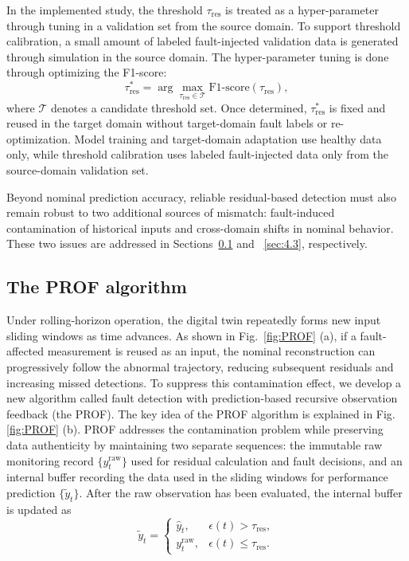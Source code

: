\documentclass[a4paper,10pt]{cas-sc}%
\newcommand{\rev}[1]{#1}
\newcommand{\roundtworev}[1]{\textcolor{roundtwored}{#1}}
\newenvironment{revision}{}{}
\begin{document}
\rev{In the implemented study, the threshold $\tau_{\mathrm{res}}$ is treated as a hyper-parameter through tuning in a validation set from the source domain. To support threshold calibration, a small amount of labeled fault-injected validation data is generated through simulation in the source domain. The hyper-parameter tuning is done through optimizing the F1-score:}
\begin{equation}
	{
		\tau_{\mathrm{res}}^{\ast}
		=\arg\max_{\tau_{\mathrm{res}}\in\mathcal{T}}
		\mathrm{F1\text{-}score}(\tau_{\mathrm{res}}),}
	\label{eq:threshold_optimization}
\end{equation}
\begin{revision}
	where $\mathcal{T}$ denotes a candidate threshold set. Once determined, $\tau_{\mathrm{res}}^{\ast}$ is fixed and reused in the target domain without target-domain fault labels or re-optimization. \roundtworev{Model training and target-domain adaptation use healthy data only, while threshold calibration uses labeled fault-injected data only from the source-domain validation set.}
\end{revision}

\roundtworev{Beyond nominal prediction accuracy, reliable residual-based detection must also remain robust to two additional sources of mismatch: fault-induced contamination of historical inputs and cross-domain shifts in nominal behavior. These two issues are addressed in Sections~\ref{sec:4.2} and ~\ref{sec:4.3}, respectively.}

\subsection{The PROF algorithm}\label{sec:4.2}

Under rolling-horizon operation, the digital twin repeatedly forms new input sliding windows as time advances. As shown in Fig.~\ref{fig:PROF} (a), if a fault-affected measurement is reused as an input, the nominal reconstruction can progressively follow the abnormal trajectory, reducing subsequent residuals and increasing missed detections. To \roundtworev{suppress} this contamination effect, we develop a new algorithm called fault detection with prediction-based recursive observation feedback (the PROF). The key idea of the PROF algorithm is explained in Fig. \ref{fig:PROF} (b). \rev{PROF addresses the contamination problem while preserving data authenticity by maintaining two separate sequences: the immutable raw monitoring record $\{y_t^{\mathrm{raw}}\}$ used for residual calculation and fault decisions, and an internal buffer recording the data used in the sliding windows for performance prediction $\{\tilde y_t\}$. After the raw observation has been evaluated, the internal buffer is updated as}
\begin{equation}
	{\tilde y_t =
		\begin{cases}
			\hat{y}_t,          & \epsilon(t) > \tau_{\mathrm{res}},    \\[6pt]
			y_t^{\mathrm{raw}}, & \epsilon(t) \leq \tau_{\mathrm{res}}.
		\end{cases}}
	\label{eq:prof_update_rule}
\end{equation}
\end{document}
